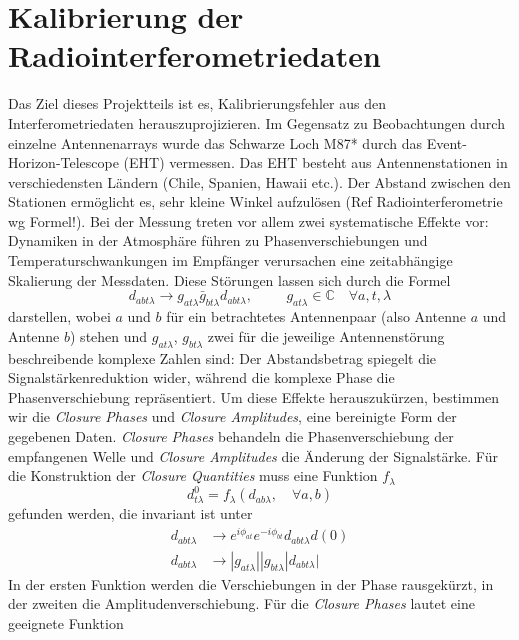 \section{Kalibrierung der Radiointerferometriedaten}
Das Ziel dieses Projektteils ist es, Kalibrierungsfehler aus den Interferometriedaten herauszuprojizieren. Im Gegensatz zu Beobachtungen durch einzelne Antennenarrays wurde das Schwarze Loch M87* durch das Event-Horizon-Telescope (EHT) vermessen. Das EHT besteht aus Antennenstationen in verschiedensten Ländern (Chile, Spanien, Hawaii etc.). Der Abstand zwischen den Stationen ermöglicht es, sehr kleine Winkel aufzulösen (Ref Radiointerferometrie wg Formel!).
Bei der Messung treten vor allem zwei systematische Effekte vor: Dynamiken in der Atmosphäre führen zu Phasenverschiebungen und Temperaturschwankungen im Empfänger verursachen eine zeitabhängige Skalierung der Messdaten. Diese Störungen lassen sich durch die Formel
$$d_{abt\lambda}\rightarrow g_{at\lambda} \bar{g}_{bt\lambda}d_{abt\lambda}, \hspace{1cm} g_{at \lambda} \in \mathbb{C} \quad \forall a,t,\lambda $$
darstellen, wobei $a$ und $b$ für ein betrachtetes Antennenpaar (also Antenne $a$ und Antenne $b$) stehen und $g_{at\lambda}$,  $g_{bt\lambda}$ zwei für die jeweilige Antennenstörung beschreibende komplexe Zahlen sind: Der Abstandsbetrag spiegelt die Signalstärkenreduktion wider, während die komplexe Phase die Phasenverschiebung repräsentiert.
Um diese Effekte herauszukürzen, bestimmen wir die \emph{Closure Phases} und \emph{Closure Amplitudes}, eine bereinigte Form der gegebenen Daten. \emph{Closure Phases} behandeln die Phasenverschiebung der empfangenen Welle und \emph{Closure Amplitudes} die Änderung der Signalstärke. Für die Konstruktion der \emph{Closure Quantities} muss eine Funktion $f_\lambda$
\begin{equation}
d^0_{t\lambda}=f_{\lambda}(d_{ab\lambda},\quad \forall a,b)
\end{equation}
gefunden werden, die invariant ist unter
\begin{align}
d_{abt\lambda} &\rightarrow e^{i \phi_{at}} e^{-i\phi_{bt}} d_{abt\lambda}d(0)\\
d_{abt\lambda}&\rightarrow|g_{at\lambda}||g_{bt\lambda}|d_{abt\lambda}|
\end{align}
In der ersten Funktion werden die Verschiebungen in der Phase rausgekürzt, in der zweiten die Amplitudenverschiebung.
Für die \emph{Closure Phases} lautet eine geeignete Funktion
